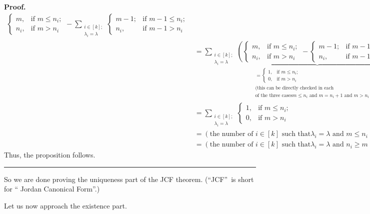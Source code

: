 \documentclass[numbers=enddot,12pt,final,onecolumn,notitlepage]{scrartcl}%
\numberwithin{exer}{subsection}
\theoremstyle{definition}
\newenvironment{proof}[1][Proof]{\noindent\textbf{#1.} }{\ \rule{0.5em}{0.5em}}
\let\sumnonlimits\sum
\renewcommand{\sum}{\sumnonlimits\limits}
\begin{document}
\begin{proof}
\begin{align*}
\begin{cases}
m, & \text{if }m\leq n_{i};\\
n_{i}, & \text{if }m>n_{i}%
\end{cases}
-\sum_{\substack{i\in\left[  k\right]  ;\\\lambda_{i}=\lambda}}%
\begin{cases}
m-1; & \text{if }m-1\leq n_{i};\\
n_{i}, & \text{if }m-1>n_{i}%
\end{cases}
\\
& =\sum_{\substack{i\in\left[  k\right]  ;\\\lambda_{i}=\lambda}%
}\underbrace{\left(
\begin{cases}
m, & \text{if }m\leq n_{i};\\
n_{i}, & \text{if }m>n_{i}%
\end{cases}
-%
\begin{cases}
m-1; & \text{if }m-1\leq n_{i};\\
n_{i}, & \text{if }m-1>n_{i}%
\end{cases}
\right)  }_{\substack{=%
\begin{cases}
1, & \text{if }m\leq n_{i};\\
0, & \text{if }m>n_{i}%
\end{cases}
\\\text{(this can be directly checked in each}\\\text{of the three cases
}m\leq n_{i}\text{ and }m=n_{i}+1\text{ and }m>n_{i}+1\text{)}}}\\
& =\sum_{\substack{i\in\left[  k\right]  ;\\\lambda_{i}=\lambda}}%
\begin{cases}
1, & \text{if }m\leq n_{i};\\
0, & \text{if }m>n_{i}%
\end{cases}
\\
& =\left(  \text{the number of }i\in\left[  k\right]  \text{ such that
}\lambda_{i}=\lambda\text{ and }m\leq n_{i}\right)  \\
& =\left(  \text{the number of }i\in\left[  k\right]  \text{ such that
}\lambda_{i}=\lambda\text{ and }n_{i}\geq m\right)  .
\end{align*}
Thus, the proposition follows.
\end{proof}

So we are done proving the uniqueness part of the JCF theorem.
(\textquotedblleft JCF\textquotedblright\ is short for \textquotedblleft
Jordan Canonical Form\textquotedblright.)

Let us now approach the existence part.
\end{document}
